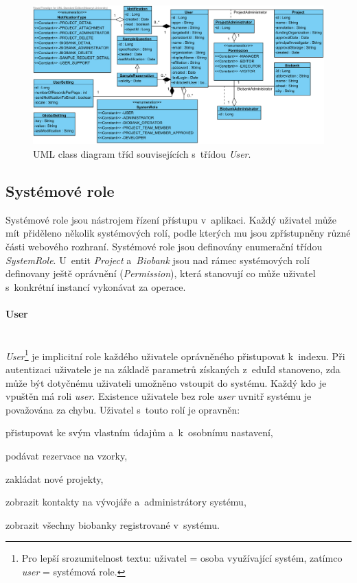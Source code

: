 \documentclass[11pt, final, oneside]{fithesis2}
\newcommand{\paragraphNewLine}[1]{\paragraph*{#1}\mbox{}\\}
\begin{document}
\begin{figure}[h!]
\begin{center}
	\includegraphics[width=\textwidth]{UserView}
\caption{UML class diagram tříd souvisejících s~třídou \textit{User}.}
\label{fig:index:uml:class:user}
\end{center}
\end{figure}

\subsection{Systémové role}
Systémové role jsou nástrojem řízení přístupu v~aplikaci. Každý uživatel může mít přiděleno několik systémových rolí, podle kterých mu jsou zpřístupněny různé části webového rozhraní. Systémové role jsou definovány enumerační třídou \textit{SystemRole}. 
U~entit \textit{Project} a~\textit{Biobank} jsou nad rámec systémových rolí definovany ještě oprávnění (\textit{Permission}), která stanovují co může uživatel s~konkrétní instancí vykonávat za operace.

\paragraphNewLine{User}
\textit{User}\footnote{Pro lepší srozumitelnost textu: uživatel = osoba využívající systém, zatímco \textit{user} = systémová role.} je implicitní role každého uživatele oprávněného přistupovat k~indexu. Při autentizaci uživatele je na základě parametrů získaných z~eduId stanoveno, zda může být dotyčnému uživateli umožněno vstoupit do systému. Každý kdo je vpuštěn má roli \textit{user}. Existence uživatele bez role \textit{user} uvnitř systému je považována za chybu.
Uživatel s~touto rolí je opravněn:
\begin{compactitem}
	\item přistupovat ke svým vlastním údajům a~k~osobnímu nastavení,
	\item podávat rezervace na vzorky,
	\item zakládat nové projekty,
	\item zobrazit kontakty na vývojáře a~administrátory systému,
	\item zobrazit všechny biobanky registrované v~systému.
\end{compactitem}
\end{document}
